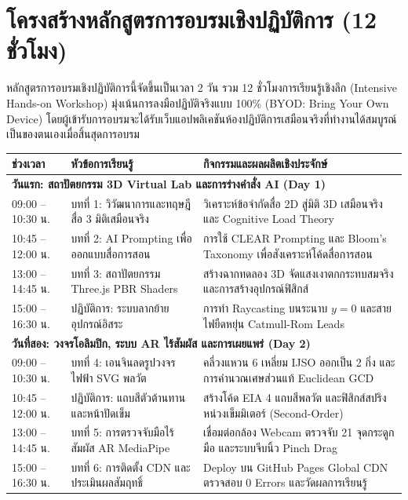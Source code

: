 \newpage

\chapter*{โครงสร้างหลักสูตรการอบรมเชิงปฏิบัติการ (12 ชั่วโมง)}

หลักสูตรการอบรมเชิงปฏิบัติการนี้จัดขึ้นเป็นเวลา 2 วัน รวม 12 ชั่วโมงการเรียนรู้เชิงลึก (Intensive Hands-on Workshop) มุ่งเน้นการลงมือปฏิบัติจริงแบบ 100\% (BYOD: Bring Your Own Device) โดยผู้เข้ารับการอบรมจะได้รับเว็บแอปพลิเคชันห้องปฏิบัติการเสมือนจริงที่ทำงานได้สมบูรณ์เป็นของตนเองเมื่อสิ้นสุดการอบรม

\vspace{0.3cm}

\begin{table}[h!]
\centering
\small
\renewcommand{\arraystretch}{1.25}
\begin{tabular}{p{2.2cm}p{4.2cm}p{6.0cm}}
\toprule
\textbf{ช่วงเวลา} & \textbf{หัวข้อการเรียนรู้} & \textbf{กิจกรรมและผลผลิตเชิงประจักษ์} \\
\midrule
\multicolumn{3}{l}{\textbf{\color{rbruNavy}วันแรก: สถาปัตยกรรม 3D Virtual Lab และการร่างคำสั่ง AI (Day 1)}} \\
09:00 -- 10:30 น. & บทที่ 1: วิวัฒนาการและทฤษฎีสื่อ 3 มิติเสมือนจริง & วิเคราะห์ข้อจำกัดสื่อ 2D สู่มิติ 3D เสมือนจริง และ Cognitive Load Theory \\
10:45 -- 12:00 น. & บทที่ 2: AI Prompting เพื่อออกแบบสื่อการสอน & การใช้ CLEAR Prompting และ Bloom's Taxonomy เพื่อสังเคราะห์โค้ดสื่อการสอน \\
13:00 -- 14:45 น. & บทที่ 3: สถาปัตยกรรม Three.js PBR Shaders & สร้างฉากทดลอง 3D จัดแสงเงาตกกระทบสมจริง และการสร้างอุปกรณ์ฟิสิกส์ \\
15:00 -- 16:30 น. & ปฏิบัติการ: ระบบลากย้ายอุปกรณ์อิสระ & การทำ Raycasting บนระนาบ $y=0$ และสายไฟยืดหยุ่น Catmull-Rom Leads \\
\midrule
\multicolumn{3}{l}{\textbf{\color{rbruNavy}วันที่สอง: วงจรโอลิมปิก, ระบบ AR ไร้สัมผัส และการเผยแพร่ (Day 2)}} \\
09:00 -- 10:30 น. & บทที่ 4: เอนจินลดรูปวงจรไฟฟ้า SVG พลวัต & คลี่วงแหวน 6 เหลี่ยม IJSO ออกเป็น 2 กิ่ง และการคำนวณเศษส่วนแท้ Euclidean GCD \\
10:45 -- 12:00 น. & ปฏิบัติการ: แถบสีตัวต้านทานและหน้าปัดเข็ม & สร้างโค้ด EIA 4 แถบสีพลวัต และฟิสิกส์สปริงหน่วงเข็มมิเตอร์ (Second-Order) \\
13:00 -- 14:45 น. & บทที่ 5: การตรวจจับมือไร้สัมผัส AR MediaPipe & เชื่อมต่อกล้อง Webcam ตรวจจับ 21 จุดกระดูกมือ และระบบจีบนิ้ว Pinch Drag \\
15:00 -- 16:30 น. & บทที่ 6: การติดตั้ง CDN และประเมินผลสัมฤทธิ์ & Deploy บน GitHub Pages Global CDN ตรวจสอบ 0 Errors และวัดผลการเรียนรู้ \\
\bottomrule
\end{tabular}
\end{table}

\cleardoublepage
